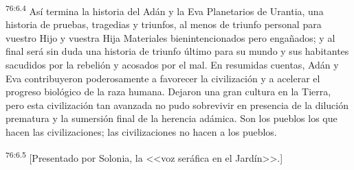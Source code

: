 \par
\textsuperscript{76:6.4} Así termina la historia del Adán y la Eva Planetarios de Urantia, una historia de pruebas, tragedias y triunfos, al menos de triunfo personal para vuestro Hijo y vuestra Hija Materiales bienintencionados pero engañados; y al final será sin duda una historia de triunfo último para su mundo y sus habitantes sacudidos por la rebelión y acosados por el mal. En resumidas cuentas, Adán y Eva contribuyeron poderosamente a favorecer la civilización y a acelerar el progreso biológico de la raza humana. Dejaron una gran cultura en la Tierra, pero esta civilización tan avanzada no pudo sobrevivir en presencia de la dilución prematura y la sumersión final de la herencia adámica. Son los pueblos los que hacen las civilizaciones; las civilizaciones no hacen a los pueblos.

\par
\textsuperscript{76:6.5} [Presentado por Solonia, la <<voz seráfica en el Jardín>>.]